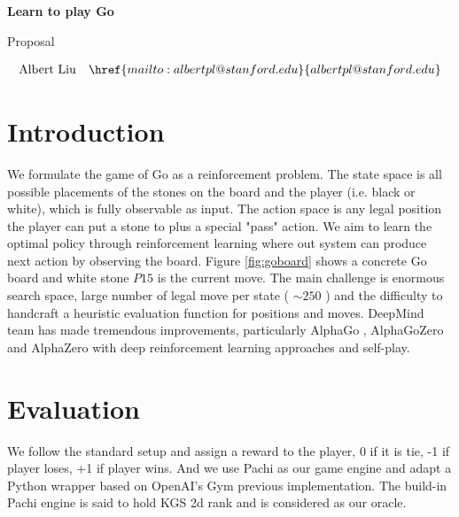 \documentclass{article}
\begin{document}
\hrulefill \par
{\Large \textbf{Learn to play Go}\par}
{\Large Proposal\par}
\hrulefill \par
\begin{align*}
\mathrm{Albert\ Liu} &&\href{mailto:albertpl@stanford.edu}{albertpl@stanford.edu}\\
\end{align*}

\section{Introduction}
We formulate the game of Go as a reinforcement problem. The state space is all possible placements of the stones on the board and the player (i.e. black or white), which is fully observable as input. The action space is any legal position the player can put a stone to plus a special "pass" action. We aim to learn the optimal policy through reinforcement learning where out system can produce next action by observing the board. Figure \ref{fig:goboard} shows a concrete Go board and white stone $P15$ is the current move. The main challenge is enormous search space, large number of legal move per state ( $\sim 250$ ) and the difficulty to handcraft a heuristic evaluation function for positions and moves. DeepMind team has made tremendous improvements, particularly AlphaGo \cite{silver2016mastering}, AlphaGoZero \cite{silver2017masteringalphagozero} and AlphaZero \cite{silver2017masteringalphazero} with deep reinforcement learning approaches and self-play.

\section{Evaluation}
We follow the standard setup and assign a reward to the player, 0 if it is tie, -1 if player loses, +1 if player wins. And we use Pachi \cite{baudivs2011pachi} as our game engine and adapt a Python wrapper based on OpenAI's Gym \cite{brockman2016openai} previous implementation. The build-in Pachi engine is said to hold KGS 2d rank and is considered as our oracle.
\end{document}
